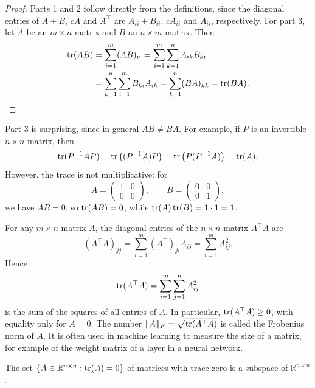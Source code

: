 \begin{proof}
    Parts 1 and 2 follow directly from the definitions, since the diagonal entries of $A + B$, $cA$ and $A^\top$ are $A_{ii} + B_{ii}$, $cA_{ii}$ and $A_{ii}$, respectively. For part 3, let $A$ be an $m \times n$ matrix and $B$ an $n \times m$ matrix. Then
    \begin{align*}
        \operatorname{tr}(AB) &= \sum_{i=1}^m (AB)_{ii} = \sum_{i=1}^m \sum_{k=1}^n A_{ik} B_{ki} \\
        &= \sum_{k=1}^n \sum_{i=1}^m B_{ki} A_{ik} = \sum_{k=1}^n (BA)_{kk} = \operatorname{tr}(BA). \qedhere
    \end{align*}
\end{proof}

\begin{remark}
    Part 3 is surprising, since in general $AB \neq BA$. For example, if $P$ is an invertible $n \times n$ matrix, then
    \[\operatorname{tr}(P^{-1}AP) = \operatorname{tr}\big((P^{-1}A)P\big) = \operatorname{tr}\big(P(P^{-1}A)\big) = \operatorname{tr}(A).\]
    However, the trace is not multiplicative: for
    \[A = \begin{pmatrix}
        1 & 0 \\
        0 & 0
    \end{pmatrix}, \qquad B = \begin{pmatrix}
        0 & 0 \\
        0 & 1
    \end{pmatrix},\]
    we have $AB = 0$, so $\operatorname{tr}(AB) = 0$, while $\operatorname{tr}(A) \operatorname{tr}(B) = 1 \cdot 1 = 1$.
\end{remark}

\begin{example}
    For any $m \times n$ matrix $A$, the diagonal entries of the $n \times n$ matrix $A^\top A$ are
    \[(A^\top A)_{jj} = \sum_{i=1}^m (A^\top)_{ji} A_{ij} = \sum_{i=1}^m A_{ij}^2.\]
    Hence
    \[\operatorname{tr}(A^\top A) = \sum_{i=1}^m \sum_{j=1}^n A_{ij}^2\]
    is the sum of the squares of all entries of $A$. In particular, $\operatorname{tr}(A^\top A) \geq 0$, with equality only for $A = 0$. The number $\|A\|_F = \sqrt{\operatorname{tr}(A^\top A)}$ is called the Frobenius norm of $A$. It is often used in machine learning to measure the size of a matrix, for example of the weight matrix of a layer in a neural network.
\end{example}

\begin{corollary}
    The set $\{A \in \mathbb{R}^{n \times n} : \operatorname{tr}(A) = 0\}$ of matrices with trace zero is a subspace of $\mathbb{R}^{n \times n}$.
\end{corollary}

